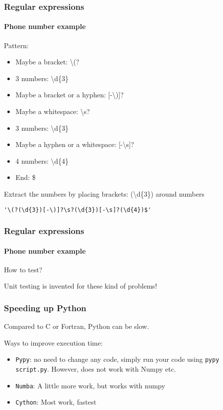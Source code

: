 \begin{frame}[fragile]\frametitle{Regular expressions}
    \framesubtitle{Phone number example}

    Pattern:
    \begin{itemize}
        \item Maybe a bracket: \textbackslash(?
        \item 3 numbers: \textbackslash d\{3\}
        \item Maybe a bracket or a hyphen: [-\textbackslash)]?
        \item Maybe a whitespace: \textbackslash s?
        \item 3 numbers: \textbackslash d\{3\}
        \item Maybe a hyphen or a whitespace: [-\textbackslash s]?
        \item 4 numbers: \textbackslash d\{4\}
        \item End: \$
    \end{itemize}

    Extract the numbers by placing brackets: (\textbackslash d\{3\}) around numbers

    \vfill\pause

    \verb|'\(?(\d{3})[-\)]?\s?(\d{3})[-\s]?(\d{4})$'|

\end{frame}

\begin{frame}\frametitle{Regular expressions}
    \framesubtitle{Phone number example}


    \pause

    How to test?

    \pause

    Unit testing is invented for these kind of problems!


\begin{frame}\frametitle{Speeding up Python}

    Compared to C or Fortran, Python can be slow.


    Ways to improve execution time:

    \begin{itemize}
        \item \texttt{Pypy}: no need to change any code, simply run your code using \texttt{pypy script.py}.
            However, does not work with Numpy etc.
        \item \texttt{Numba}: A little more work, but works with numpy
        \item \texttt{Cython}: Most work, fastest
    \end{itemize}

\end{frame}

\end{frame}


